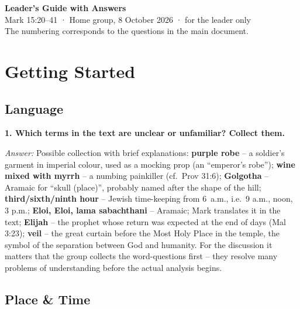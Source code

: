 \documentclass[12pt,a4paper]{article}
\newcommand{\frage}[1]{\par\vspace{0.7em}\noindent\textbf{#1}\par}
\newcommand{\antwort}[1]{\par\noindent\textit{Answer:} #1\par}
\begin{document}
\begin{center}
  {\LARGE\bfseries Leader's Guide with Answers}\\[4pt]
  {\large Mark 15:20--41 · Home group, 8 October 2026 · for the leader only}\\[4pt]
  {\footnotesize The numbering corresponds to the questions in the main document.}
\end{center}

\section*{Getting Started}

\subsection*{Language}

\frage{1. Which terms in the text are unclear or unfamiliar? Collect them.}
\antwort{Possible collection with brief explanations: \textbf{purple robe} -- a soldier's garment in imperial colour, used as a mocking prop (an ``emperor's robe''); \textbf{wine mixed with myrrh} -- a numbing painkiller (cf.~Prov 31:6); \textbf{Golgotha} -- Aramaic for ``skull (place)'', probably named after the shape of the hill; \textbf{third/sixth/ninth hour} -- Jewish time-keeping from 6~a.m., i.e.~9 a.m., noon, 3 p.m.; \textbf{Eloi, Eloi, lama sabachthani} -- Aramaic; Mark translates it in the text; \textbf{Elijah} -- the prophet whose return was expected at the end of days (Mal 3:23); \textbf{veil} -- the great curtain before the Most Holy Place in the temple, the symbol of the separation between God and humanity. For the discussion it matters that the group collects the word-questions first -- they resolve many problems of understanding before the actual analysis begins.}

\subsection*{Place \& Time}
\end{document}
